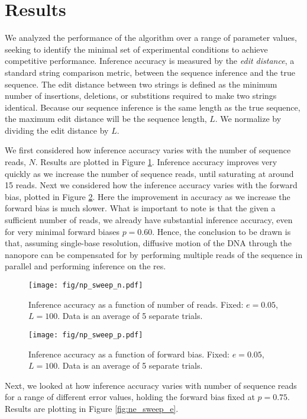 \documentclass[12pt]{article}
\begin{document}
\section{Results}

We analyzed the performance of the algorithm over a range of parameter values, seeking to identify the minimal set of experimental conditions to achieve competitive performance. Inference accuracy is measured by the \emph{edit distance}, a standard string comparison metric, between the sequence inference and the true sequence. The edit distance between two strings is defined as the minimum number of insertions, deletions, or substitions required to make two strings identical. Because our sequence inference is the same length as the true sequence, the maximum edit distance will be the sequence length, $L$. We normalize by dividing the edit distance by $L$.

We first considered how inference accuracy varies with the number of sequence reads, $N$. Results are plotted in Figure \ref{fig:np_sweep_n}. Inference accuracy improves very quickly as we increase the number of sequence reads, until saturating at around 15 reads. Next we considered how the inference accuracy varies with the forward bias, plotted in Figure \ref{fig:np_sweep_p}. Here the improvement in accuracy as we increase the forward bias is much slower. What is important to note is that the given a sufficient number of reads, we already have substantial inference accuracy, even for very minimal forward biases $p=0.60$. Hence, the conclusion to be drawn is that, assuming single-base resolution, diffusive motion of the DNA through the nanopore can be compensated for by performing multiple reads of the sequence in parallel and performing inference on the res.

\begin{figure}
\centering
\texttt{[image: fig/np\_sweep\_n.pdf]}
\caption{Inference accuracy as a function of number of reads. Fixed: $e=0.05$, $L=100$. Data is an average of 5 separate trials.}
\label{fig:np_sweep_n}
\end{figure}

\begin{figure}
\centering
\texttt{[image: fig/np\_sweep\_p.pdf]}
\caption{Inference accuracy as a function of forward bias. Fixed: $e=0.05$, $L=100$. Data is an average of 5 separate trials.}
\label{fig:np_sweep_p}
\end{figure}

Next, we looked at how inference accuracy varies with number of sequence reads for a range of different error values, holding the forward bias fixed at $p=0.75$. Results are plotting in Figure \ref{fig:ne_sweep_e}.
\end{document}
